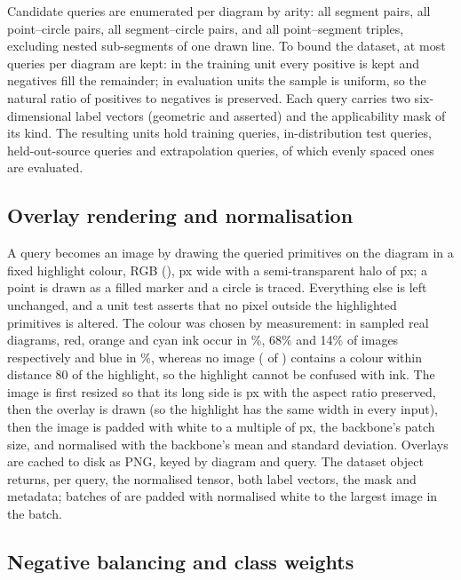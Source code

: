 Candidate queries are enumerated per diagram by arity: all segment pairs, all point--circle pairs, all segment--circle pairs, and all point--segment triples, excluding nested sub-segments of one drawn line. To bound the dataset, at most \queryCap{} queries per diagram are kept: in the training unit every positive is kept and negatives fill the remainder; in evaluation units the sample is uniform, so the natural ratio of positives to negatives is preserved. Each query carries two six-dimensional label vectors (geometric and asserted) and the applicability mask of its kind. The resulting units hold \nTrainQueries{} training queries, \nQueriesGeometryTest{} in-distribution test queries, \nQueriesPgdpHeldout{} held-out-source queries and \nQueriesSynthExtrap{} extrapolation queries, of which \extrapEvalCap{} evenly spaced ones are evaluated.

\subsection{Overlay rendering and normalisation}

A query becomes an image by drawing the queried primitives on the diagram in a fixed highlight colour, RGB (\overlayRGB), \overlayWidthPx{} px wide with a semi-transparent halo of \overlayHaloPx{} px; a point is drawn as a filled marker and a circle is traced. Everything else is left unchanged, and a unit test asserts that no pixel outside the highlighted primitives is altered. The colour was chosen by measurement: in \nColourImages{} sampled real diagrams, red, orange and cyan ink occur in \pctColourRed\%, 68\% and 14\% of images respectively and blue in \pctColourBlue\%, whereas no image (\nColourNearHighlight{} of \nColourImages) contains a colour within distance 80 of the highlight, so the highlight cannot be confused with ink. The image is first resized so that its long side is  px with the aspect ratio preserved, then the overlay is drawn (so the highlight has the same width in every input), then the image is padded with white to a multiple of  px, the backbone's patch size, and normalised with the backbone's mean and standard deviation. Overlays are cached to disk as PNG, keyed by diagram and query. The dataset object returns, per query, the normalised tensor, both label vectors, the mask and metadata; batches of \ftBatch{} are padded with normalised white to the largest image in the batch.

\subsection{Negative balancing and class weights}


